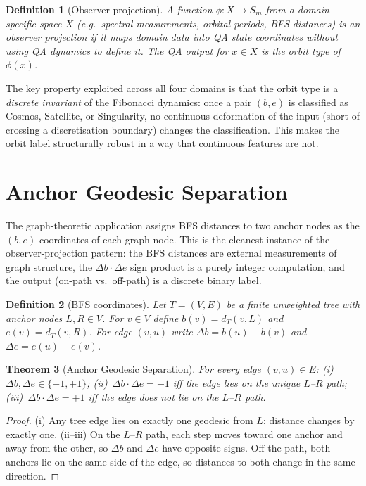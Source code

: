 \documentclass[11pt]{article}
\newtheorem{definition}{Definition}[section]
\newtheorem{theorem}[definition]{Theorem}
\begin{document}
\begin{definition}[Observer projection]
A function $\phi : X \to S_m$ from a domain-specific space $X$ (e.g.\ spectral
measurements, orbital periods, BFS distances) is an \emph{observer projection} if
it maps domain data into QA state coordinates without using QA dynamics to define it.
The QA output for $x \in X$ is the orbit type of $\phi(x)$.
\end{definition}

The key property exploited across all four domains is that the orbit type is a
\emph{discrete invariant} of the Fibonacci dynamics: once a pair $(b,e)$ is
classified as Cosmos, Satellite, or Singularity, no continuous deformation of
the input (short of crossing a discretisation boundary) changes the classification.
This makes the orbit label structurally robust in a way that continuous features are not.

\section{Anchor Geodesic Separation}\label{sec:ags}

The graph-theoretic application assigns BFS distances to two anchor nodes as the
$(b,e)$ coordinates of each graph node.  This is the cleanest instance of the
observer-projection pattern: the BFS distances are external measurements of graph
structure, the $\Delta b \cdot \Delta e$ sign product is a purely integer computation,
and the output (on-path vs.\ off-path) is a discrete binary label.

\begin{definition}[BFS coordinates]
Let $T = (V,E)$ be a finite unweighted tree with anchor nodes $L, R \in V$.
For $v \in V$ define $b(v) = d_T(v,L)$ and $e(v) = d_T(v,R)$.
For edge $(v,u)$ write $\Delta b = b(u)-b(v)$ and $\Delta e = e(u)-e(v)$.
\end{definition}

\begin{theorem}[Anchor Geodesic Separation]\label{thm:ags}
For every edge $(v,u) \in E$: (i)~$\Delta b, \Delta e \in \{-1,+1\}$;
(ii)~$\Delta b \cdot \Delta e = -1$ iff the edge lies on the unique $L$--$R$ path;
(iii)~$\Delta b \cdot \Delta e = +1$ iff the edge does not lie on the $L$--$R$ path.
\end{theorem}

\begin{proof}
(i) Any tree edge lies on exactly one geodesic from $L$; distance changes by exactly one.
(ii--iii) On the $L$--$R$ path, each step moves toward one anchor and away from the other,
so $\Delta b$ and $\Delta e$ have opposite signs.  Off the path, both anchors lie on the
same side of the edge, so distances to both change in the same direction.
\end{proof}
\end{document}
